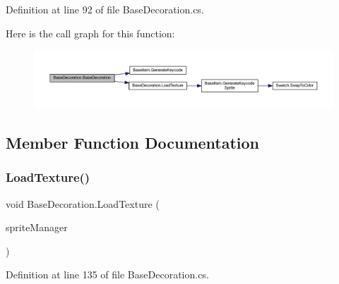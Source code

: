 Definition at line 92 of file Base\+Decoration.\+cs.

Here is the call graph for this function\+:
\nopagebreak
\begin{figure}[H]
\begin{center}
\leavevmode
\includegraphics[width=350pt]{class_base_decoration_a75dae0a3df64d463e98ba2bdeed02265_cgraph}
\end{center}
\end{figure}


\subsection{Member Function Documentation}
\mbox{\label{class_base_decoration_aafdc27ba3ede4f9eadc66e8dd6fa9b1a}} 
\subsubsection{\texorpdfstring{LoadTexture()}{LoadTexture()}}
{\footnotesize\ttfamily void Base\+Decoration.\+Load\+Texture (\begin{DoxyParamCaption}\item[{\mbox{\hyperlink{class_sprite_manager}{Sprite\+Manager}}}]{sprite\+Manager }\end{DoxyParamCaption})}



Definition at line 135 of file Base\+Decoration.\+cs.

